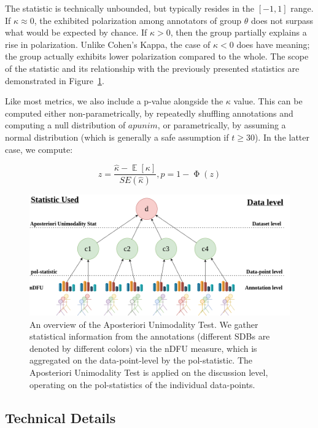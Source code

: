 \documentclass{article}
\begin{document}
The statistic is technically unbounded, but typically resides in the $[-1, 1]$ range. If $\kappa \approx 0$, the exhibited polarization among annotators of group $\theta$ does not surpass what would be expected by chance. If $\kappa > 0$, then the group partially explains a rise in polarization. Unlike Cohen's Kappa, the case of $\kappa < 0$ does have meaning; the group actually exhibits lower polarization compared to the whole. The scope of the statistic and its relationship with the previously presented statistics are demonstrated in Figure~\ref{fig::overview}. 

Like most metrics, we also include a p-value alongside the $\kappa$ value. This can be computed either non-parametrically, by repeatedly shuffling annotations and computing a null distribution of $apunim$, or parametrically, by assuming a normal distribution (which is generally a safe assumption if $t \geq 30$). %
In the latter case, we compute:
 
\begin{equation}
	z = \frac{\hat{\kappa}  - \mathop{\mathbb{E}}[\kappa]}{SE(\hat{\kappa})}, p = 1 - \mathop{\Phi}(z)
\end{equation}

\begin{figure}
	\includegraphics[width=\linewidth]{overview.png}
	\caption{An overview of the Aposteriori Unimodality Test. We gather statistical information from the annotations (different \acp{SDB} are denoted by different colors) via the \ac{nDFU} measure, which is aggregated on the data-point-level by the pol-statistic. The Aposteriori Unimodality Test is applied on the discussion level, operating on the pol-statistics of the individual data-points.}
	\label{fig::overview}
\end{figure}


\subsection{Technical Details}
\label{ssec:methodology:details}
\end{document}
